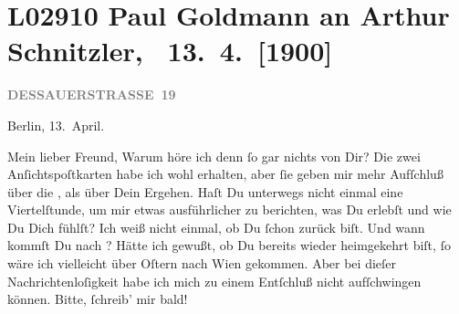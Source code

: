 

\section[ Paul Goldmann an Arthur Schnitzler, 13. 4. {[}1900{]}]{L02910 Paul Goldmann an Arthur Schnitzler,  13. 4. {[}1900{]}}
\nopagebreak{}
\rehead{ }\normalsize\beginnumbering{}
\toendnotes[C]{\smallbreak\pagebreak[2]}
\toendnotes[C]{\smallbreak}
\toendnotes[C]{\smallbreak}
\pstart
           {\pb}\textcolor{gray}{\textbf{DESSAUERSTRASSE 19}}\pend
           
\pstart
           \raggedleft{}Berlin, 13. April.\pend
           
\pstart{}Mein lieber Freund,\pend\vspace{0.5em}
\pstart
           Warum höre ich denn{ }ſo gar nichts von Dir? Die zwei Anſichtspoſtkarten habe ich wohl
               erhalten, aber{ }ſie geben mir mehr Aufſchluß über die \label{K_L02910-1v}\label{K_L02910-1}, als über
               Dein Ergehen. Haſt Du unterwegs nicht einmal eine Viertelſtunde, um mir etwas
               ausführlicher zu berichten, was Du erlebſt und wie Du Dich fühlſt? Ich weiß nicht
               einmal, ob Du{ }ſchon zurück biſt. Und wann kommſt Du nach \label{K_L02910-2v}\label{K_L02910-2}?
               Hätte ich gewußt, ob Du bereits wieder {\pb}heimgekehrt
               biſt,{ }ſo  wäre ich vielleicht über Oſtern nach
                  Wien gekommen. Aber bei dieſer
               Nachrichtenloſigkeit habe ich mich zu einem Entſchluß nicht aufſchwingen können.
               Bitte,{ }ſchreib’ mir bald!\pend
           
